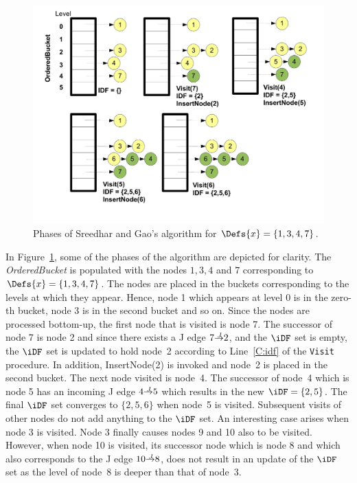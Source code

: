 {    \begin{figure}[htb]
    \centerline{\includegraphics[scale=0.3]{sreedhargao.pdf}}
    \caption{Phases of Sreedhar and Gao's algorithm for $\Defs{x}=\{1,3,4,7\}$.}
    \label{fig:sreedhargao}
    \end{figure} 

In Figure~\ref{fig:sreedhargao}, some of the phases of the algorithm are 
depicted for clarity. The \textit{OrderedBucket}
is populated with the nodes $1,3,4$ and $7$ corresponding to $\Defs{x}=\{1,3,4,7\}$. The nodes are
placed in the buckets corresponding to the levels at which they appear. Hence, node 1 which appears at 
level 0 is in the zero-th bucket, node 3 is in the second bucket and so on. Since the
nodes are processed bottom-up, the first node that is visited is node 7. The successor of node 7 is node
2 and since there exists a J edge $7 \st{J} 2$, and the $\iDF$ set is empty, the $\iDF$ set is updated
to hold node~2 according to Line~\ref{C:idf} of the \texttt{Visit} procedure. In addition, InsertNode(2) is invoked and 
node~2 is placed in the second bucket. The next node visited is node~4. The successor of node~4 which is node
5 has an incoming J edge $4 \st{J} 5$ which results in the new $\iDF = \{2,5\}$. The final $\iDF$ set converges
to $\{2,5,6\}$ when node~5 is visited. Subsequent visits of other nodes do not add anything to the
$\iDF$ set. An interesting case arises when node 3 is visited. Node 3 finally causes nodes 9 and 10 also 
to be visited. However, when node 10 is visited, its successor node which is node 8 and which also 
corresponds to the J edge $10 \st{J} 8$, does not result in an update of the $\iDF$ set as the level of
node~8 is deeper than that of node~3.


}
